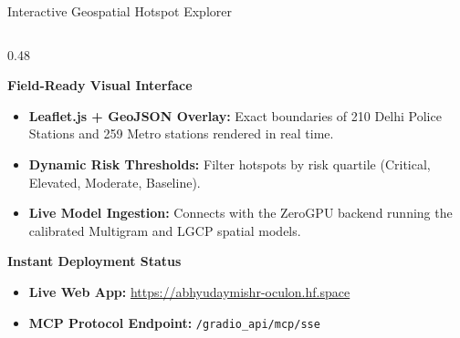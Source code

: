 \documentclass[aspectratio=169,10pt]{beamer}
\begin{document}
\begin{frame}{Interactive Geospatial Hotspot Explorer}
  \begin{columns}[T]
    \begin{column}{0.48\textwidth}
      \begin{block}{\textbf{Field-Ready Visual Interface}}
        \footnotesize
        \begin{itemize}\itemsep=0.4em
          \item \textbf{Leaflet.js + GeoJSON Overlay:} Exact boundaries of 210 Delhi Police Stations and 259 Metro stations rendered in real time.
          \item \textbf{Dynamic Risk Thresholds:} Filter hotspots by risk quartile (Critical, Elevated, Moderate, Baseline).
          \item \textbf{Live Model Ingestion:} Connects with the ZeroGPU backend running the calibrated Multigram and LGCP spatial models.
        \end{itemize}
      \end{block}

      \begin{block}{\textbf{Instant Deployment Status}}
        \footnotesize
        \begin{itemize}\itemsep=0.2em
          \item \textbf{Live Web App:} \url{https://abhyudaymishr-oculon.hf.space}
          \item \textbf{MCP Protocol Endpoint:} \texttt{/gradio\_api/mcp/sse}
        \end{itemize}
      \end{block}
    \end{column}


\end{columns}
\end{frame}
\end{document}
